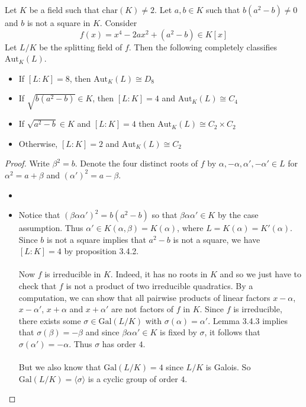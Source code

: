 \documentclass[a4paper]{article}
\begin{document}
\begin{thm}{}{} Let $K$ be a field such that $\text{char}(K)\neq 2$. Let $a,b\in K$ such that $b(a^2-b)\neq 0$ and $b$ is not a square in $K$. Consider $$f(x)=x^4-2ax^2+(a^2-b)\in K[x]$$ Let $L/K$ be the splitting field of $f$. Then the following completely classifies $\text{Aut}_K(L)$. 
\begin{itemize}
\item If $[L:K]=8$, then $\text{Aut}_K(L)\cong D_8$
\item If $\sqrt{b(a^2-b)}\in K$, then $[L:K]=4$ and $\text{Aut}_K(L)\cong C_4$
\item If $\sqrt{a^2-b}\in K$ and $[L:K]=4$ then $\text{Aut}_K(L)\cong C_2\times C_2$
\item Otherwise, $[L:K]=2$ and $\text{Aut}_K(L)\cong C_2$
\end{itemize} \tcbline
\begin{proof}
Write $\beta^2=b$. Denote the four distinct roots of $f$ by $\alpha,-\alpha,\alpha',-\alpha'\in L$ for $\alpha^2=a+\beta$ and $(\alpha')^2=a-\beta$. 
\begin{itemize}
\item 
\item Notice that $(\beta\alpha\alpha')^2=b(a^2-b)$ so that $\beta\alpha\alpha'\in K$ by the case assumption. Thus $\alpha'\in K(\alpha,\beta)=K(\alpha)$, where $L=K(\alpha)=K'(\alpha)$. Since $b$ is not a square implies that $a^2-b$ is not a square, we have $[L:K]=4$ by proposition 3.4.2. \\~\\

Now $f$ is irreducible in $K$. Indeed, it has no roots in $K$ and so we just have to check that $f$ is not a product of two irreducible quadratics. By a computation, we can show that all pairwise products of linear factors $x-\alpha$, $x-\alpha'$, $x+\alpha$ and $x+\alpha'$ are not factors of $f$ in $K$. Since $f$ is irreducible, there exists some $\sigma\in\text{Gal}(L/K)$ with $\sigma(\alpha)=\alpha'$. Lemma 3.4.3 implies that $\sigma(\beta)=-\beta$ and since $\beta\alpha\alpha'\in K$ is fixed by $\sigma$, it follows that $\sigma(\alpha')=-\alpha$. Thus $\sigma$ has order $4$. \\~\\

But we also know that $\text{Gal}(L/K)=4$ since $L/K$ is Galois. So $\text{Gal}(L/K)=\langle\sigma\rangle$ is a cyclic group of order $4$. 


\end{itemize}
\end{proof}
\end{thm}
\end{document}
